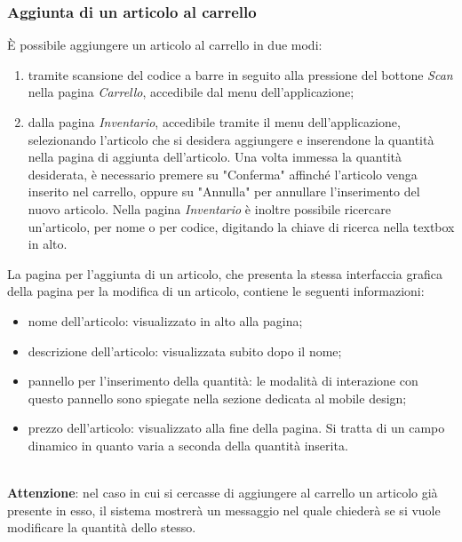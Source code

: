 \documentclass[12pt, a4paper, titlepage]{report}
\begin{document}
	\subsubsection{Aggiunta di un articolo al carrello}
	È possibile aggiungere un articolo al carrello in due modi: 
	\begin{enumerate}
		\item tramite scansione del codice a barre in seguito alla pressione del bottone \textit{Scan} nella pagina \textit{Carrello}, accedibile dal menu dell'applicazione;
		\item dalla pagina \textit{Inventario}, accedibile tramite il menu dell'applicazione, selezionando l'articolo che si desidera aggiungere e inserendone la quantità nella pagina di aggiunta dell'articolo. Una volta immessa la quantità desiderata, è necessario premere su "Conferma" affinché l'articolo venga inserito nel carrello, oppure su "Annulla" per annullare l'inserimento del nuovo articolo. Nella pagina \textit{Inventario} è inoltre possibile ricercare un'articolo, per nome o per codice, digitando la chiave di ricerca nella textbox in alto.
	\end{enumerate}
	La pagina per l'aggiunta di un articolo, che presenta la stessa interfaccia grafica della pagina per la modifica di un articolo, contiene le seguenti informazioni:
	\begin{itemize}
		\item nome dell'articolo: visualizzato in alto alla pagina;
		\item descrizione dell'articolo: visualizzata subito dopo il nome;
		\item pannello per l'inserimento della quantità: le modalità di interazione con questo pannello sono spiegate nella sezione dedicata al mobile design;
		\item prezzo dell'articolo: visualizzato alla fine della pagina. Si tratta di un campo dinamico in quanto varia a seconda della quantità inserita.
	\end{itemize}
	\\ \textbf{Attenzione}: nel caso in cui si cercasse di aggiungere al carrello un articolo già presente in esso, il sistema mostrerà un messaggio nel quale chiederà se si vuole modificare la quantità dello stesso.
	
\end{document}

